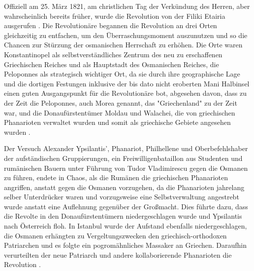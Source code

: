\documentclass[preprint]{geomorphica} %
\begin{document}
Offiziell am 25. März 1821, am christlichen Tag der Verkündung des Herren, aber wahrscheinlich bereits früher, wurde die Revolution von der Filiki Etairia ausgerufen \cite{Zelepos2015}.
Die Revolutionäre begannen die Revolution an drei Orten gleichzeitig zu entfachen, um den Überraschungsmoment auszunutzen und so die Chancen zur Stürzung der osmanischen Herrschaft zu erhöhen.
Die Orte waren Konstantinopel als selbstverständliches Zentrum des neu zu erschaffenen Griechischen Reiches und als Hauptstadt des Osmanischen Reiches, die Peloponnes als strategisch wichtiger Ort, da sie durch ihre geographische Lage und die dortigen Festungen inklusive der bis dato nicht eroberten Mani Halbinsel einen guten Ausgangspunkt für die Revolutionäre bot, abgesehen davon, dass zu der Zeit die Peloponnes, auch Morea genannt, das "Griechenland" zu der Zeit war, und die Donaufürstentümer Moldau und Walachei, die von griechischen Phanarioten verwaltet wurden und somit als griechische Gebiete angesehen wurden \cite{Brewer2001, Dakin1973, Forster1958}.

Der Versuch Alexander Ypsilantis', Phanariot, Philhellene und Oberbefehlshaber der aufständischen Gruppierungen, ein Freiwilligenbataillon aus Studenten und rumänischen Bauern unter Führung von Tudor Vladimirescu gegen die Osmanen zu führen, endete in Chaos, als die Rumänen die griechischen Phanarioten angriffen, anstatt gegen die Osmanen vorzugehen, da die Phanarioten jahrelang selber Unterdrücker waren und vorzugsweise eine Selbstverwaltung angestrebt wurde anstatt eine Auflehnung gegenüber der Großmacht.
Dies führte dazu, dass die Revolte in den Donaufürstentümern niedergeschlagen wurde und Ypsilantis nach Österreich floh.
In Istanbul wurde der Aufstand ebenfalls niedergeschlagen, die Osmanen erhängten zu Vergeltungszwecken den griechisch-orthodoxen Patriarchen und es folgte ein pogromähnliches Massaker an Griechen.
Daraufhin verurteilten der neue Patriarch und andere kollaborierende Phanarioten die Revolution \cite{Brewer2001, Dakin1973, Clogg1979, Forster1958}.
\end{document}

